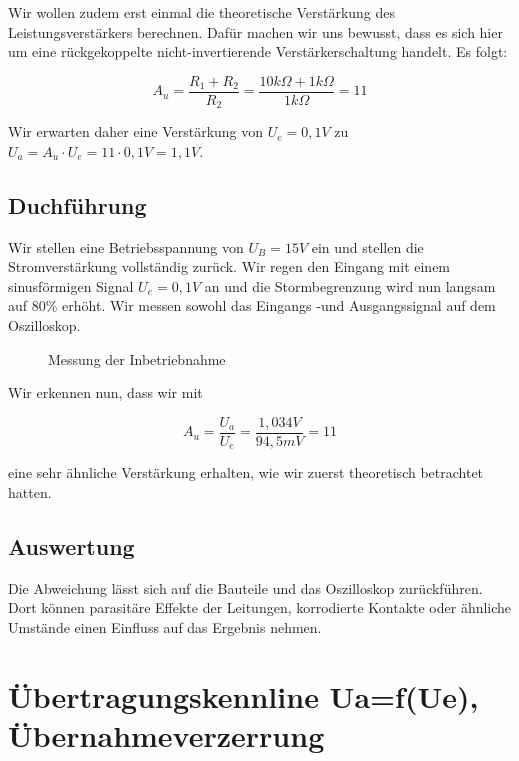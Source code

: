 \documentclass{article}
\begin{document}
Wir wollen zudem erst einmal die theoretische Verstärkung des Leistungsverstärkers berechnen. Dafür machen wir uns bewusst, dass es sich hier um eine rückgekoppelte nicht-invertierende Verstärkerschaltung handelt. Es folgt:

\begin{equation}
  \label{eq:1}
  A_{u} = \frac{R_{1}+R_{2}}{R_{2}} = \frac{10k\Omega + 1k\Omega}{1k\Omega} = 11
\end{equation}

Wir erwarten daher eine Verstärkung von $U_{e} = 0,1V$ zu $U_{a} = A_{u} \cdot U_{e} = 11 \cdot 0,1V = 1,1V$.

\subsection{Duchführung}
\label{sec:duchfuhrung}

Wir stellen eine Betriebsspannung von $U_{B} = 15V$ ein und stellen die Stromverstärkung vollständig zurück. Wir regen den Eingang mit einem sinusförmigen Signal $U_{e} = 0,1V$ an und die Stormbegrenzung wird nun langsam auf 80\% erhöht. Wir messen sowohl das Eingangs -und Ausgangssignal auf dem Oszilloskop.

\begin{figure}[h]
  \centering

  \caption{Messung der Inbetriebnahme}
  \label{fig:osziinbetrieb}
\end{figure}

Wir erkennen nun, dass wir mit

\begin{equation*}
  A_{u} = \frac{U_{a}}{U_{e}} = \frac{1,034V}{94,5mV} = 11
\end{equation*}

eine sehr ähnliche Verstärkung erhalten, wie wir zuerst theoretisch betrachtet hatten.

\subsection{Auswertung}
\label{sec:auswertung}

Die Abweichung lässt sich auf die Bauteile und das Oszilloskop zurückführen. Dort können parasitäre Effekte der Leitungen, korrodierte Kontakte oder ähnliche Umstände einen Einfluss auf das Ergebnis nehmen.

\newpage
\section{Übertragungskennline Ua=f(Ue), Übernahmeverzerrung}
\label{sec:ubertr-ua=f-ubern}
\end{document}
